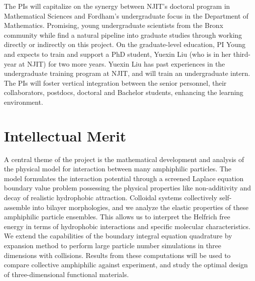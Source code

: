The PIs will capitalize on the synergy between NJIT's doctoral program
in Mathematical Sciences and Fordham's undergraduate focus in the
Department of Mathematics. Promising, young undergraduate scientists
from the Bronx community while find a natural pipeline into graduate
studies through working directly or indirectly on this project. On the
graduate-level education, PI Young and expects to train and
support a PhD student, Yuexin Liu (who is in her third-year at NJIT) for
two more years. Yuexin Liu has past experiences in the undergraduate
training program at NJIT, and will train an undergraduate intern. The
PIs will foster vertical integration between the senior personnel, their
collaborators, postdocs, doctoral and Bachelor students, enhancing the
learning environment.
%


%
%

\section{Intellectual Merit}
A central theme of the project is the mathematical development and
analysis of the physical model for interaction between many amphiphilic
particles. The model formulates the interaction potential through a
screened Laplace equation boundary value problem possessing the physical
properties like non-additivity and decay of realistic hydrophobic
attraction. Colloidal systems collectively self-assemble into bilayer
morphologies, and we analyze the elastic properties of these amphiphilic
particle ensembles. This allows us to interpret the Helfrich free
energy in terms of hydrophobic interactions and specific molecular
characteristics. We extend the capabilities of the boundary integral
equation quadrature by expansion method to perform large particle number
simulations in three dimensions with collisions. Results from these
computations will be used to compare collective amphiphilic against
experiment, and study the optimal design of three-dimensional
functional materials. 


